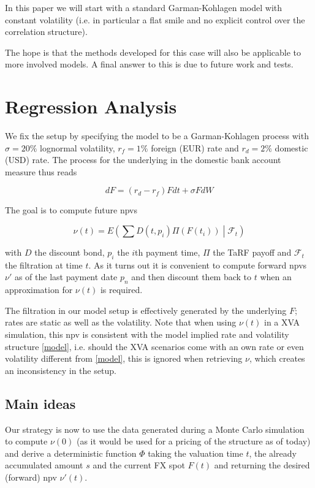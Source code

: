 \documentclass{amsart}
\theoremstyle{plain}
\numberwithin{equation}{section}
\begin{document}
In this paper we will start with a standard Garman-Kohlagen model with constant volatility (i.e. in particular a flat smile and no explicit control over the correlation structure).

The hope is that the methods developed for this case will also be applicable to more involved models. A final answer to this is due to future work and tests.

\section{Regression Analysis}

We fix the setup by specifying the model to be a Garman-Kohlagen process with $\sigma = 20\%$ lognormal volatility, $r_f=1\%$ foreign (EUR) rate and $r_d=2\%$ domestic (USD) rate. The process for the underlying in the domestic bank account measure thus reads

\begin{equation}\label{model}
dF = (r_d - r_f) F dt + \sigma F dW
\end{equation}

The goal is to compute future npvs 

\begin{equation}
\nu(t) = E\left( \sum D(t,p_i) \Pi(F(t_i)) \middle| \mathcal{F}_t \right)
\end{equation}

with $D$ the discount bond, $p_i$ the $i$th payment time, $\Pi$ the TaRF payoff and $\mathcal{F}_t$ the filtration at time $t$. As it turns out it is convenient to compute forward npvs $\nu'$ as of the last payment date $p_n$ and then discount them back to $t$ when an approximation for $\nu(t)$ is required.

The filtration in our model setup is effectively generated by the underlying $F$; rates are static as well as the volatility. Note that when using $\nu(t)$ in a XVA simulation, this npv is consistent with the model implied rate and volatility structure \ref{model}, i.e. should the XVA scenarios come with an own rate or even volatility different from \ref{model}, this is ignored when retrieving $\nu$, which creates an inconsistency in the setup.

\subsection{Main ideas}

Our strategy is now to use the data generated during a Monte Carlo simulation to compute $\nu(0)$ (as it would be used for a pricing of the structure as of today) and derive a deterministic function $\Phi$ taking the valuation time $t$, the already accumulated amount $s$ and the current FX spot $F(t)$ and returning the desired (forward) npv $\nu'(t)$.
\end{document}
